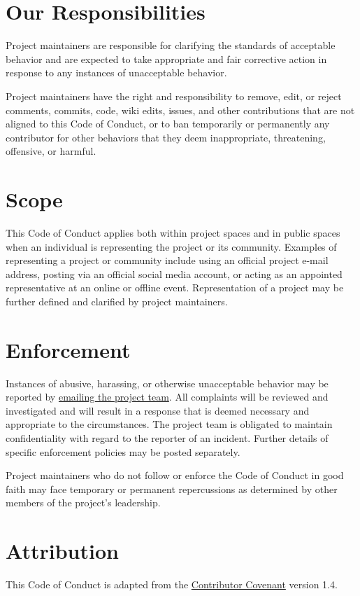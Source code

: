 \section{Our Responsibilities}\label{s:conduct-responsibilities}

Project maintainers are responsible for clarifying the standards of
acceptable behavior and are expected to take appropriate and fair
corrective action in response to any instances of unacceptable
behavior.

Project maintainers have the right and responsibility to remove, edit,
or reject comments, commits, code, wiki edits, issues, and other
contributions that are not aligned to this Code of Conduct, or to ban
temporarily or permanently any contributor for other behaviors that
they deem inappropriate, threatening, offensive, or harmful.

\section{Scope}\label{s:conduct-scope}

This Code of Conduct applies both within project spaces and in public
spaces when an individual is representing the project or its
community. Examples of representing a project or community include
using an official project e-mail address, posting via an official
social media account, or acting as an appointed representative at an
online or offline event. Representation of a project may be further
defined and clarified by project maintainers.

\section{Enforcement}\label{s:conduct-enforcement}

Instances of abusive, harassing, or otherwise unacceptable behavior
may be reported by \href{gvwilson@third-bit.com}{emailing the project team}. All
complaints will be reviewed and investigated and will result in a
response that is deemed necessary and appropriate to the
circumstances. The project team is obligated to maintain
confidentiality with regard to the reporter of an incident. Further
details of specific enforcement policies may be posted separately.

Project maintainers who do not follow or enforce the Code of Conduct
in good faith may face temporary or permanent repercussions as
determined by other members of the project's leadership.

\section{Attribution}\label{s:conduct-attribution}

This Code of Conduct is adapted from
the \href{https://www.contributor-covenant.org}{Contributor Covenant} version 1.4.

